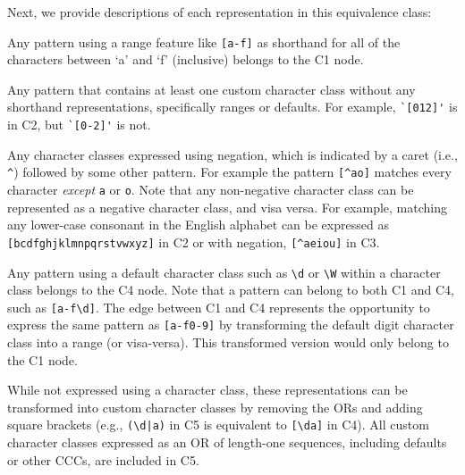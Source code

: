 Next, we provide descriptions of each representation in this equivalence class:
\begin{description}  \itemsep -1pt
\item[C1:] Any pattern using a range feature like \verb![a-f]! as shorthand for all of the characters between `a' and `f' (inclusive) belongs to the C1 node.

\item[C2:] Any pattern that contains at least one  custom character class  without any shorthand representations, specifically ranges or defaults. For example, \verb!`[012]'! is in C2, but \verb!`[0-2]'! is not.

\item[C3:] Any character classes expressed using negation, which is indicated by a caret (i.e., \verb!^!) followed by some other pattern.  For example the pattern \verb![^ao]! matches every character \emph{except} \verb!a! or \verb!o!.  Note that any non-negative character class can be represented as a negative character class, and visa versa.  For example, matching any lower-case consonant in the English alphabet can be expressed as \verb![bcdfghjklmnpqrstvwxyz]! in C2 or with negation, \verb![^aeiou]! in C3.


\item[C4:] Any pattern using a default character class such as \verb!\d! or \verb!\W! within a character class belongs to the C4 node.  Note that a pattern can belong to both C1 and C4, such as \verb![a-f\d]!.  The edge between C1 and C4 represents the opportunity to express the same pattern as \verb![a-f0-9]! by transforming the default digit character class into a range (or visa-versa).  This transformed version would only belong to the C1 node.

\item[C5:] While not expressed using a character class, these representations can be transformed into custom character classes by removing the ORs and adding square brackets (e.g., \verb!(\d|a)! in C5 is equivalent to \verb![\da]! in C4). All custom character classes expressed as an OR of length-one sequences, including defaults or other CCCs, are included in C5. 
\end{description}

